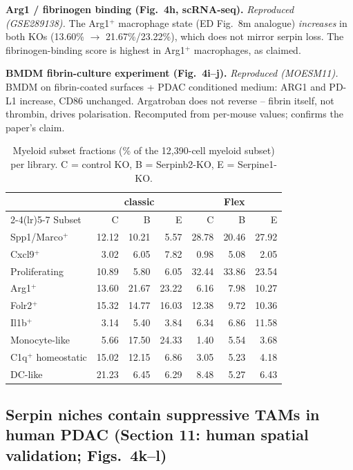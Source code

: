 \documentclass[preprint,12pt]{elsarticle}
\begin{document}
\textbf{Arg1 / fibrinogen binding (Fig.~4h, scRNA-seq).}
\emph{Reproduced (GSE289138).} The Arg1$^{+}$ macrophage state
(ED Fig.~8m analogue) \emph{increases} in both KOs
(13.60\% $\to$ 21.67\%/23.22\%), which does not mirror serpin
loss. The fibrinogen-binding score is highest in Arg1$^{+}$
macrophages, as claimed.

\textbf{BMDM fibrin-culture experiment (Fig.~4i--j).}
\emph{Reproduced (MOESM11).} BMDM on fibrin-coated surfaces +
PDAC conditioned medium: ARG1 and PD-L1 increase, CD86 unchanged.
Argatroban does not reverse -- fibrin itself, not thrombin, drives
polarisation. Recomputed from per-mouse values; confirms the
paper's claim.

\begin{table}[t]
\centering
\footnotesize
\caption{Myeloid subset fractions (\% of the 12{,}390-cell myeloid
subset) per library. C = control KO, B = Serpinb2-KO, E =
Serpine1-KO.}
\label{tab:mac}
\begin{tabular}{lrrrrrr}
\toprule
 & \multicolumn{3}{c}{classic} & \multicolumn{3}{c}{Flex} \\
\cmidrule(lr){2-4}\cmidrule(lr){5-7}
Subset & C & B & E & C & B & E \\
\midrule
Spp1/Marco$^{+}$    & 12.12 & 10.21 & 5.57 & 28.78 & 20.46 & 27.92 \\
Cxcl9$^{+}$         & 3.02 & 6.05 & 7.82 & 0.98 & 5.08 & 2.05 \\
Proliferating       & 10.89 & 5.80 & 6.05 & 32.44 & 33.86 & 23.54 \\
Arg1$^{+}$          & 13.60 & 21.67 & 23.22 & 6.16 & 7.98 & 10.27 \\
Folr2$^{+}$         & 15.32 & 14.77 & 16.03 & 12.38 & 9.72 & 10.36 \\
Il1b$^{+}$          & 3.14 & 5.40 & 3.84 & 6.34 & 6.86 & 11.58 \\
Monocyte-like       & 5.66 & 17.50 & 24.33 & 1.40 & 5.54 & 3.68 \\
C1q$^{+}$ homeostatic & 15.02 & 12.15 & 6.86 & 3.05 & 5.23 & 4.18 \\
DC-like             & 21.23 & 6.45 & 6.29 & 8.48 & 5.27 & 6.43 \\
\bottomrule
\end{tabular}
\end{table}

\subsection{Serpin niches contain suppressive TAMs in human PDAC
(Section 11: human spatial validation; Figs.~4k--l)}
\end{document}
